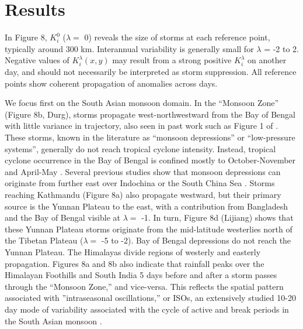 \section{Results}	
		 	 		
	 In Figure 8, $K_i^0$ ($\lambda =$ 0) reveals the size of storms at each reference point, typically around 300 km. Interannual variability is generally small for $\lambda$ = -2 to 2. Negative values of $K_i^\lambda(x,y)$ may result from a strong positive $K_i^{\lambda}$  on another day, and should not necessarily be interpreted as storm suppression. All reference points show coherent propagation of anomalies across days. 
	 
	 We focus first on the South Asian monsoon domain. In the ``Monsoon Zone'' (Figure 8b, Durg), storms propagate west-northwestward from the Bay of Bengal with little variance in trajectory, also seen in past work such as Figure 1 of \cite{Sikka1977}. These storms, known in the literature as ``monsoon depressions'' or ``low-pressure systems''\parencite{Sikka1977,Chen1999,Krishnamurthy2010}, generally do not reach tropical cyclone intensity. Instead, tropical cyclone occurrence in the Bay of Bengal is confined mostly to October-November and April-May \parencite{Li2013}. Several previous studies show that monsoon depressions can originate from further east over Indochina or the South China Sea \parencite{Saha1981}. Storms reaching Kathmandu (Figure 8a) also propagate westward, but their primary source is the Yunnan Plateau to the east, with a contribution from Bangladesh and the Bay of Bengal visible at $\lambda =$ -1. In turn, Figure 8d (Lijiang) shows that these Yunnan Plateau storms originate from the mid-latitude westerlies north of the Tibetan Plateau ($\lambda =$ -5 to -2). Bay of Bengal depressions do not reach the Yunnan Plateau. The Himalayas divide regions of westerly and easterly propagation. Figures 8a and 8b also indicate that rainfall peaks over the Himalayan Foothills and South India 5 days before and after a storm passes through the ``Monsoon Zone,'' and vice-versa. This reflects the spatial pattern associated with ''intraseasonal oscillations,'' or ISOs, an extensively studied 10-20 day mode of variability associated with the cycle of active and break periods in the South Asian monsoon \parencite{Krishnamurti1980,Chen1993,Annamalai2001,Han2006,Fujinami2011,Fujinami2014}.
	 	 
